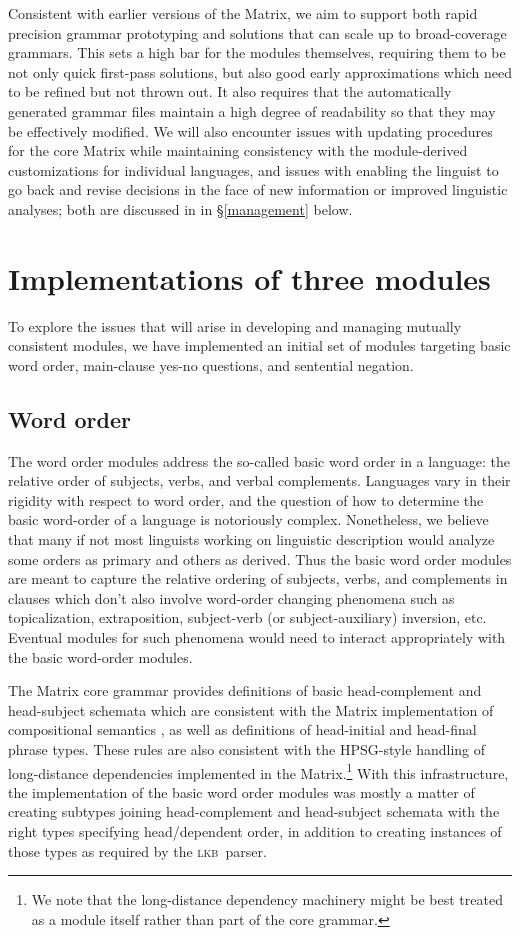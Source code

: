 \documentclass[11pt]{article}
\newcommand{\lkb}{\textsc{lkb}}
\begin{document}
Consistent with earlier versions of the Matrix, we aim to support
both rapid precision grammar prototyping and solutions that can scale up
to broad-coverage grammars. This sets a high bar for the modules themselves,
requiring them to be not only quick first-pass solutions, but also
good early approximations which need to be refined but not thrown out.
It also requires that the automatically generated grammar files 
maintain a high degree of readability so that they may be effectively
modified.  We will also encounter issues with updating procedures for
the core Matrix while maintaining consistency with the module-derived
customizations for individual languages, and issues with enabling the
linguist to go back and revise decisions in the face of new
information or improved linguistic analyses; both are discussed in
in \S\ref{management} below.

\section{Implementations of three modules}
\label{imp}

To explore the issues that will arise in developing and managing
mutually consistent modules, we have
implemented an initial set of modules targeting basic
word order, main-clause yes-no questions, and sentential negation.  

\subsection{Word order}

The word order modules address the so-called basic word order in
a language: the relative order of subjects, verbs, and verbal complements.
Languages vary in their rigidity with respect to word order, and the
question of how to determine the basic word-order of a language is 
notoriously complex.  Nonetheless, we believe that many if not most
linguists working on linguistic description would analyze some orders
as primary and others as derived.  Thus the basic word order modules
are meant to capture the relative ordering of subjects, verbs, and complements
in clauses which don't also involve word-order changing phenomena
such as topicalization, extraposition, subject-verb (or subject-auxiliary)
inversion, etc.  Eventual modules for such phenomena would need to
interact appropriately with the basic word-order modules.

The Matrix core grammar provides definitions of basic
head-complement and head-subject schemata which are consistent with
the Matrix implementation of compositional semantics
\cite{Fli:Ben:03}, as well as definitions of head-initial and
head-final phrase types.  These rules are also consistent with the
HPSG-style handling of long-distance dependencies implemented in the
Matrix.\footnote{We note that the long-distance dependency machinery
might be best treated as a module itself rather than part of the core
grammar.}  With this infrastructure, the implementation of the basic
word order modules was mostly a matter of creating subtypes joining
head-complement and head-subject schemata with the right types
specifying head/dependent order, in addition to creating instances of
those types as required by the \lkb\ parser.
\end{document}
